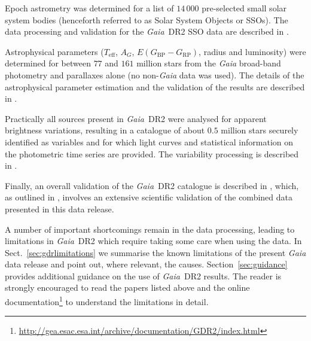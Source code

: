 \documentclass[longauth]{aa_gaia} %
\newcommand\gaia{\textit{Gaia}}
\newcommand\gdr[1]{\gaia~DR#1}
\newcommand\secref[1]{Sect.~\ref{#1}}
\newcommand\secrefalt[1]{Section~\ref{#1}}
\newcommand\gbp{\ensuremath{G_\mathrm{BP}}}
\newcommand\grp{\ensuremath{G_\mathrm{RP}}}
\newcommand\teff{\ensuremath{T_\mathrm{eff}}}
\newcommand\ag{\ensuremath{A_G}}
\newcommand\ebpminrp{\ensuremath{E(\gbp-\grp)}}
\begin{document}
Epoch astrometry was determined for a list of $14\,000$ pre-selected small solar system bodies
(henceforth referred to as Solar System Objects or SSOs). The data processing and validation for the
\gdr{2} SSO data are described in \cite{DR2-DPACP-32}.

Astrophysical parameters (\teff, \ag, \ebpminrp, radius and luminosity) were determined for between
$77$ and $161$ million stars from the {\gaia} broad-band photometry and parallaxes alone (no
non-{\gaia} data was used). The details of the astrophysical parameter estimation and the validation
of the results are described in \cite{DR2-DPACP-43}. 

Practically all sources present in \gdr{2} were analysed for apparent brightness variations,
resulting in a catalogue of about $0.5$ million stars securely identified as variables and for which
light curves and statistical information on the photometric time series are provided. The
variability processing is described in \cite{DR2-DPACP-49}.

Finally, an overall validation of the \gdr{2} catalogue is described in \cite{DR2-DPACP-39}, which, as
outlined in \cite{2016A&A...595A...1G}, involves an extensive scientific validation of the combined
data presented in this data release.

A number of important shortcomings remain in the data processing, leading to limitations in
\gdr{2} which require taking some care when using the data. In \secref{sec:gdrlimitations} we
summarise the known limitations of the present {\gaia} data release and point out, where relevant,
the causes. \secrefalt{sec:guidance} provides additional guidance on the use of \gdr{2} results.
The reader is strongly encouraged to read the papers listed above and the online
documentation\footnote{\url{http://gea.esac.esa.int/archive/documentation/GDR2/index.html}} to
understand the limitations in detail.
\end{document}
